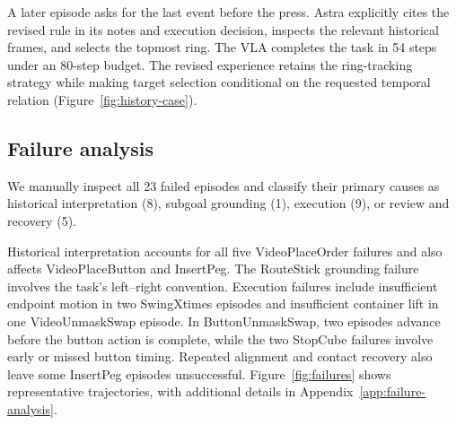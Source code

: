 A later episode asks for the last event before the press. Astra explicitly cites the revised rule in its notes and execution decision, inspects the relevant historical frames, and selects the topmost ring. The VLA completes the task in 54 steps under an 80-step budget. The revised experience retains the ring-tracking strategy while making target selection conditional on the requested temporal relation (Figure~\ref{fig:history-case}).

\begin{casefigure}
\hfill
{}\hfill
{}
\caption{Experience revision across three VideoPlaceButton episodes. The initial rule tracks ring identity but assumes a before-press query. A first-after query prompts a conditional revision, later applied to a last-before query. Figure~\ref{fig:within-episode-cases}(b) shows the late swap within episode 3.}
\label{fig:history-case}
\end{casefigure}

\subsection{Failure analysis}

We manually inspect all 23 failed episodes and classify their primary causes as historical interpretation (8), subgoal grounding (1), execution (9), or review and recovery (5).

Historical interpretation accounts for all five VideoPlaceOrder failures and also affects VideoPlaceButton and InsertPeg. The RouteStick grounding failure involves the task's left--right convention. Execution failures include insufficient endpoint motion in two SwingXtimes episodes and insufficient container lift in one VideoUnmaskSwap episode. In ButtonUnmaskSwap, two episodes advance before the button action is complete, while the two StopCube failures involve early or missed button timing. Repeated alignment and contact recovery also leave some InsertPeg episodes unsuccessful. Figure~\ref{fig:failures} shows representative trajectories, with additional details in Appendix~\ref{app:failure-analysis}.


